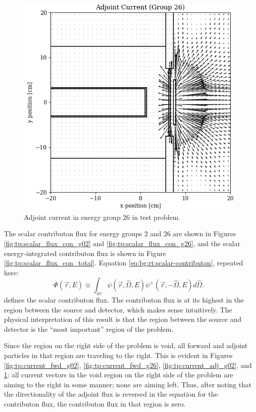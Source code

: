 \begin{figure}
\begin{minipage}{0.49\linewidth}
    \includegraphics[width=\linewidth]{content/testprob/current_adj_g26.png}
    \caption{Adjoint current in energy group 26 in test problem.}
    \label{fig:tp:current_adj_g26}
  \end{minipage}
\end{figure}

The scalar contributon flux for energy groups 2 and 26 are shown in Figures \ref{fig:tp:scalar_flux_con_g02} and \ref{fig:tp:scalar_flux_con_g26}, and the scalar energy-integrated contributon flux is shown in Figure \ref{fig:tp:scalar_flux_con_total}.
Equation \ref{eq:bg:rt:scalar-contributon}, repeated here:
\begin{equation*}
  \Phi\left(\vec{r},E\right) \equiv
  \int_{4\pi}\psi\left(\vec{r},\hat{\Omega},E\right)\psi^+\left(\vec{r},-\hat{\Omega},E\right)d\hat{\Omega}.
\end{equation*}
defines the scalar contributon flux.
The contributon flux is at its highest in the region between the source and detector, which makes sense intuitively.
The physical interpretation of this result is that the region between the source and detector is the ``most important'' region of the problem.

Since the region on the right side of the problem is void, all forward and adjoint particles in that region are traveling to the right.
This is evident in Figures \ref{fig:tp:current_fwd_g02}, \ref{fig:tp:current_fwd_g26}, \ref{fig:tp:current_adj_g02}, and \ref{fig:tp:current_adj_g26}: all current vectors in the void region on the right side of the problem are aiming to the right in some manner; none are aiming left.
Thus, after noting that the directionality of the adjoint flux is reversed in the equation for the contributon flux, the contributon flux in that region is zero.

